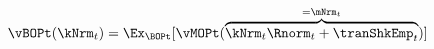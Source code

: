   \begin{equation}\begin{gathered}\begin{aligned}
\vBOPt(\kNrm_{t}) & = \Ex_{\BOPt}[\vMOPt(\overbrace{\kNrm_{t} \Rnorm_{t} + \tranShkEmp_{t}}^{=\mNrm_{t}})]  \label{eq:vBOPt}
      \end{aligned}\end{gathered}\end{equation}
